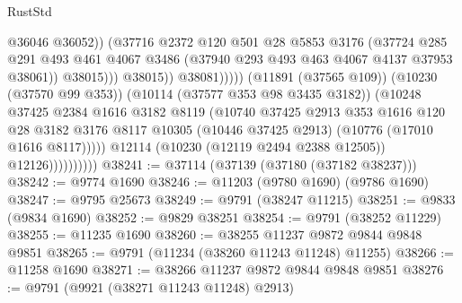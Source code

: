 \begin{lexlean}{RustStd}
\begin{coremodule}
                                                @36046
                                                @36052))
                                            (@37716
                                              @2372
                                              @120
                                              @501
                                              @28
                                              @5853
                                              @3176
                                              (@37724
                                                @285
                                                @291
                                                @493
                                                @461
                                                @4067
                                                @3486
                                                (@37940 @293 @493 @463 @4067 @4137 @37953 @38061))
                                              @38015)))
                                        @38015))
                                    @38081)))))
                          (@11891 (@37565 @109))
                          (@10230 (@37570 @99 @353))
                          (@10114 (@37577 @353 @98 @3435 @3182))
                          (@10248
                            @37425
                            @2384
                            @1616
                            @3182
                            @8119
                            (@10740
                              @37425
                              @2913
                              @353
                              @1616
                              @120
                              @28
                              @3182
                              @3176
                              @8117
                              @10305
                              (@10446 @37425 @2913)
                              (@10776 (@17010 @1616 @8117)))))
                        @12114
                        (@10230 (@12119 @2494 @2388 @12505))
                        @12126))))))))))
@38241 := @37114 (@37139 (@37180 (@37182 @38237)))
@38242 := @9774 @1690
@38246 := @11203 (@9780 @1690) (@9786 @1690)
@38247 := @9795 @25673
@38249 := @9791 (@38247 @11215)
@38251 := @9833 (@9834 @1690)
@38252 := @9829 @38251
@38254 := @9791 (@38252 @11229)
@38255 := @11235 @1690
@38260 := @38255 @11237 @9872 @9844 @9848 @9851
@38265 := @9791 (@11234 (@38260 @11243 @11248) @11255)
@38266 := @11258 @1690
@38271 := @38266 @11237 @9872 @9844 @9848 @9851
@38276 := @9791 (@9921 (@38271 @11243 @11248) @2913)

\end{coremodule}
\end{lexlean}
